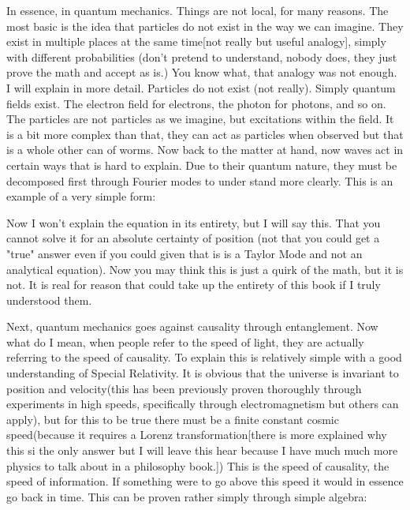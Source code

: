In essence, in quantum mechanics. Things are not local, for many reasons. The most basic is the idea that particles do not exist in the way we can imagine. They exist in multiple places at the same time[not really but useful analogy], simply with different probabilities (don't pretend to understand, nobody does, they just prove the math and accept as is.) You know what, that analogy was not enough. I will explain in more detail. Particles do not exist (not really). Simply quantum fields exist. The electron field for electrons, the photon for photons, and so on. The particles are not particles as we imagine, but excitations within the field. It is a bit more complex than that, they can act as particles when observed but that is a whole other can of worms. Now back to the matter at hand, now waves act in certain ways that is hard to explain. Due to their quantum nature, they must be decomposed first through Fourier modes to under stand more clearly. This is an example of a very simple form:

 
 
Now I won't explain the equation in its entirety, but I will say this. That you cannot solve it for an absolute certainty of position (not that you could get a "true" answer even if you could given that is is a Taylor Mode and not an analytical equation). Now you may think this is just a quirk of the math, but it is not. It is real for reason that could take up the entirety of this book if I truly understood them.

Next, quantum mechanics goes against causality through entanglement. Now what do I mean, when people refer to the speed of light, they are actually referring to the speed of causality. To explain this is relatively simple with a good understanding of Special Relativity. It is obvious that the universe is invariant to position and velocity(this has been previously proven thoroughly through experiments in high speeds, specifically through electromagnetism but others can apply), but for this to be true there must be a finite constant cosmic speed(because it requires a Lorenz transformation[there is more explained why this si the only answer but I will leave this hear because I have much much more physics to talk about in a philosophy book.]) This is the speed of causality, the speed of information. If something were to go above this speed it would in essence go back in time. This can be proven rather simply through simple algebra:

 
 
 
 
